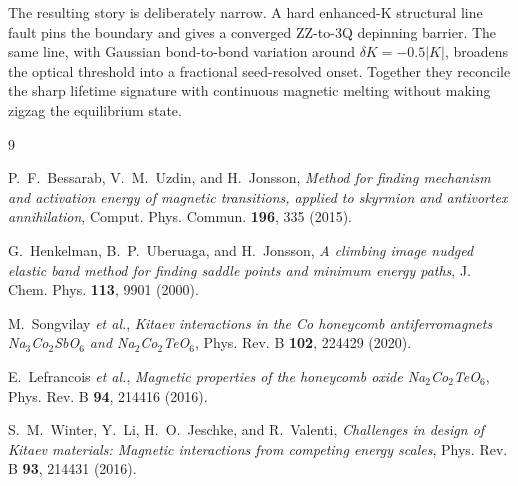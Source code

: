 \documentclass[aps,prb,twocolumn,superscriptaddress,floatfix,nofootinbib]{revtex4-2}
\begin{document}
The resulting story is deliberately narrow.  A hard enhanced-K structural line
fault pins the boundary and gives a converged ZZ-to-3Q depinning barrier.  The
same line, with Gaussian bond-to-bond variation around $\delta K=-0.5|K|$,
broadens the optical threshold into a fractional seed-resolved onset.  Together they reconcile the sharp lifetime
signature with continuous magnetic melting without making zigzag the equilibrium
state.

\begin{thebibliography}{9}

P.~F.~Bessarab, V.~M.~Uzdin, and H.~Jonsson,
\textit{Method for finding mechanism and activation energy of magnetic
transitions, applied to skyrmion and antivortex annihilation},
Comput. Phys. Commun. \textbf{196}, 335 (2015).

G.~Henkelman, B.~P.~Uberuaga, and H.~Jonsson,
\textit{A climbing image nudged elastic band method for finding saddle points
and minimum energy paths},
J. Chem. Phys. \textbf{113}, 9901 (2000).

M.~Songvilay \emph{et al.},
\textit{Kitaev interactions in the Co honeycomb antiferromagnets
Na$_3$Co$_2$SbO$_6$ and Na$_2$Co$_2$TeO$_6$},
Phys. Rev. B \textbf{102}, 224429 (2020).

E.~Lefrancois \emph{et al.},
\textit{Magnetic properties of the honeycomb oxide Na$_2$Co$_2$TeO$_6$},
Phys. Rev. B \textbf{94}, 214416 (2016).

S.~M.~Winter, Y.~Li, H.~O.~Jeschke, and R.~Valenti,
\textit{Challenges in design of Kitaev materials: Magnetic interactions from
competing energy scales},
Phys. Rev. B \textbf{93}, 214431 (2016).

\end{thebibliography}
\end{document}
